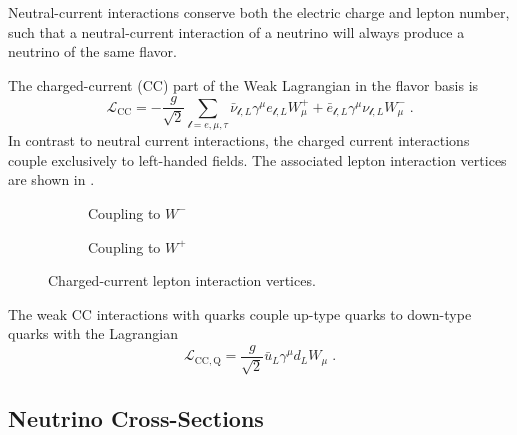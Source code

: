 Neutral-current interactions conserve both the electric charge and lepton number, such that a neutral-current interaction of a neutrino will always produce a neutrino of the same flavor.

The charged-current (CC) part of the Weak Lagrangian in the flavor basis is
\begin{equation}
    \mathcal{L}_\mathrm{CC} = -\frac{g}{\sqrt{2}} \sum_{\mathcal{l}=e,\mu,\tau} \bar{\nu}_{\mathcal{l},L} \gamma^\mu e_{\mathcal{l},L} W^+_\mu + \bar{e}_{\mathcal{l},L} \gamma^\mu \nu_{\mathcal{l},L} W^-_\mu\;.\label{eq:ew-cc-lagrangian}
\end{equation}
In contrast to neutral current interactions, the charged current interactions couple exclusively to left-handed fields. The associated lepton interaction vertices are shown in .
\begin{figure}
\centering
\begin{subfigure}{0.3\linewidth}
    \caption{Coupling to $W^-$}
\end{subfigure}
\begin{subfigure}{0.3\linewidth}
    \caption{Coupling to $W^+$}
\end{subfigure}
\caption{Charged-current lepton interaction vertices.}
\label{fig:cc-vertices}
\end{figure}
The weak CC interactions with quarks couple up-type quarks to down-type quarks with the Lagrangian
\begin{equation}
    \mathcal{L}_\mathrm{CC,Q} = \frac{g}{\sqrt{2}}\bar{u}_L\gamma^\mu d_L W_\mu\;.
\end{equation}

\subsection{Neutrino Cross-Sections}
\label{sec:neutrino-xsec}

